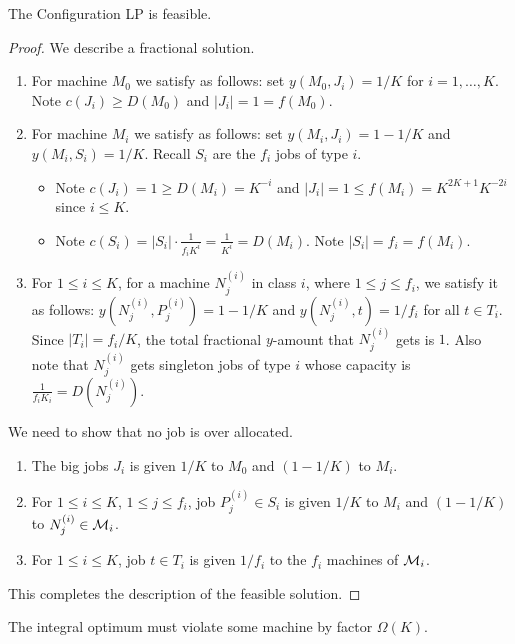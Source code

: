 	\begin{lemma}
		The Configuration LP is feasible.
	\end{lemma}
	\begin{proof}
		We describe a fractional solution.
		\begin{enumerate}
			\item For machine $M_0$ we satisfy as follows: set  $y(M_0,J_i) = 1/K$ for $i=1,\ldots,K$. Note $c(J_i) \geq D(M_0)$ and $|J_i| = 1 = f(M_0)$. 
			\item For machine $M_i$ we satisfy as follows: set $y(M_i,J_i) = 1-1/K$ and $y(M_i,S_i) = 1/K$. Recall $S_i$ are the $f_i$ jobs of type $i$. 
			\begin{itemize}
				\item Note $c(J_i) = 1 \geq D(M_i) = K^{-i}$ and 	$|J_i| = 1 \leq f(M_i) = K^{2K+1}K^{-2i}$ since $i\leq K$.
				\item Note $c(S_i) = |S_i|\cdot \frac{1}{f_iK^i} = \frac{1}{K^i} = D(M_i)$. Note $|S_i| = f_i = f(M_i)$.
			\end{itemize}
			\item For $1\leq i\leq K$, for a machine $N^{(i)}_j$ in class $i$, where $1\leq j\leq f_i$, we satisfy it as follows: $y(N^{(i)}_j, P^{(i)}_j) = 1-1/K$ and $y(N^{(i)}_j, t) = 1/f_i$ for all $t\in T_i$.
			Since $|T_i| = f_i/K$, the total fractional $y$-amount that $N^{(i)}_j$ gets is $1$. Also note that $N^{(i)}_j$ gets singleton jobs of type $i$ whose capacity is $\frac{1}{f_iK_i} = D(N^{(i)}_j)$.
		\end{enumerate}
		We need to show that no job is over allocated.
		\begin{enumerate}
			\item The big jobs $J_i$ is given $1/K$ to $M_0$ and $(1-1/K)$ to $M_i$.
			\item For $1\leq i\leq K$, $1\leq j\leq f_i$, job $P^{(i)}_j \in S_i$ is given $1/K$ to $M_i$ and $(1-1/K)$ to $N^{(i)}_j\in \mathcal{M}_i$.
			\item For $1\leq i\leq K$, job $t\in T_i$ is given $1/f_i$ to the $f_i$ machines of $\mathcal{M}_i$.
		\end{enumerate}
		This completes the description of the feasible solution.
	\end{proof}
	\begin{lemma}
		The integral optimum must violate some machine by factor $\Omega(K)$.
	\end{lemma}
